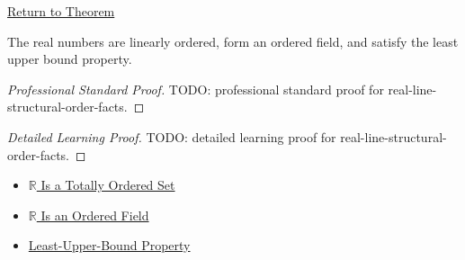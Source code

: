 \newpage
{}
\label{prf:real-line-structural-order-facts}

\begin{remark*}[Return]
\hyperref[thm:real-line-structural-order-facts]{Return to Theorem}
\end{remark*}

\begin{theorem*}
The real numbers are linearly ordered, form an ordered field, and satisfy the
least upper bound property.
\end{theorem*}

\begin{proof}[Professional Standard Proof]
\LRAProofBodyStart
TODO: professional standard proof for real-line-structural-order-facts.
\end{proof}

\begin{proof}[Detailed Learning Proof]
\LRAProofBodyStart
TODO: detailed learning proof for real-line-structural-order-facts.
\end{proof}

\begin{remark*}
\end{remark*}

\begin{dependencies}
\begin{itemize}
  \item \hyperref[thm:r-totally-ordered-set]{$\mathbb{R}$ Is a Totally Ordered Set}
  \item \hyperref[thm:r-is-an-ordered-field]{$\mathbb{R}$ Is an Ordered Field}
  \item \hyperref[thm:lub-property-r]{Least-Upper-Bound Property}
\end{itemize}
\end{dependencies}

\clearpage
